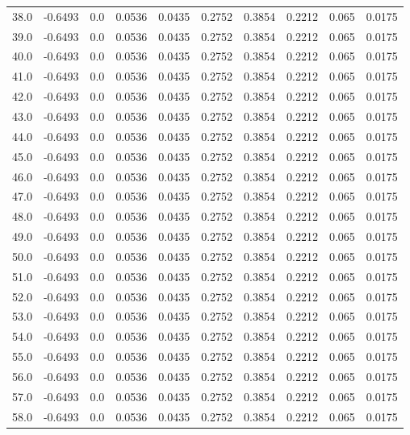 \begin{longtable}{lrrrrrrrrr}
38.0 & -0.6493 & 0.0 & 0.0536 & 0.0435 & 0.2752 & 0.3854 & 0.2212 & 0.065 & 0.0175 \\
39.0 & -0.6493 & 0.0 & 0.0536 & 0.0435 & 0.2752 & 0.3854 & 0.2212 & 0.065 & 0.0175 \\
40.0 & -0.6493 & 0.0 & 0.0536 & 0.0435 & 0.2752 & 0.3854 & 0.2212 & 0.065 & 0.0175 \\
41.0 & -0.6493 & 0.0 & 0.0536 & 0.0435 & 0.2752 & 0.3854 & 0.2212 & 0.065 & 0.0175 \\
42.0 & -0.6493 & 0.0 & 0.0536 & 0.0435 & 0.2752 & 0.3854 & 0.2212 & 0.065 & 0.0175 \\
43.0 & -0.6493 & 0.0 & 0.0536 & 0.0435 & 0.2752 & 0.3854 & 0.2212 & 0.065 & 0.0175 \\
44.0 & -0.6493 & 0.0 & 0.0536 & 0.0435 & 0.2752 & 0.3854 & 0.2212 & 0.065 & 0.0175 \\
45.0 & -0.6493 & 0.0 & 0.0536 & 0.0435 & 0.2752 & 0.3854 & 0.2212 & 0.065 & 0.0175 \\
46.0 & -0.6493 & 0.0 & 0.0536 & 0.0435 & 0.2752 & 0.3854 & 0.2212 & 0.065 & 0.0175 \\
47.0 & -0.6493 & 0.0 & 0.0536 & 0.0435 & 0.2752 & 0.3854 & 0.2212 & 0.065 & 0.0175 \\
48.0 & -0.6493 & 0.0 & 0.0536 & 0.0435 & 0.2752 & 0.3854 & 0.2212 & 0.065 & 0.0175 \\
49.0 & -0.6493 & 0.0 & 0.0536 & 0.0435 & 0.2752 & 0.3854 & 0.2212 & 0.065 & 0.0175 \\
50.0 & -0.6493 & 0.0 & 0.0536 & 0.0435 & 0.2752 & 0.3854 & 0.2212 & 0.065 & 0.0175 \\
51.0 & -0.6493 & 0.0 & 0.0536 & 0.0435 & 0.2752 & 0.3854 & 0.2212 & 0.065 & 0.0175 \\
52.0 & -0.6493 & 0.0 & 0.0536 & 0.0435 & 0.2752 & 0.3854 & 0.2212 & 0.065 & 0.0175 \\
53.0 & -0.6493 & 0.0 & 0.0536 & 0.0435 & 0.2752 & 0.3854 & 0.2212 & 0.065 & 0.0175 \\
54.0 & -0.6493 & 0.0 & 0.0536 & 0.0435 & 0.2752 & 0.3854 & 0.2212 & 0.065 & 0.0175 \\
55.0 & -0.6493 & 0.0 & 0.0536 & 0.0435 & 0.2752 & 0.3854 & 0.2212 & 0.065 & 0.0175 \\
56.0 & -0.6493 & 0.0 & 0.0536 & 0.0435 & 0.2752 & 0.3854 & 0.2212 & 0.065 & 0.0175 \\
57.0 & -0.6493 & 0.0 & 0.0536 & 0.0435 & 0.2752 & 0.3854 & 0.2212 & 0.065 & 0.0175 \\
58.0 & -0.6493 & 0.0 & 0.0536 & 0.0435 & 0.2752 & 0.3854 & 0.2212 & 0.065 & 0.0175 \\

\end{longtable}
